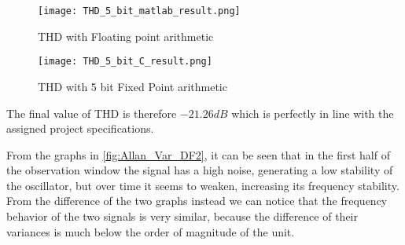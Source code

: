 \begin{figure}[ht]
	\begin{minipage}[b]{0.5\linewidth}
		\centering
		\texttt{[image: THD\_5\_bit\_matlab\_result.png]}
		\caption{THD with Floating point arithmetic}
		\label{fig:THD_5_bit_FL_P}
	\end{minipage}
	\hspace{0.5cm}
	\begin{minipage}[b]{0.5\linewidth}
		\centering
		\texttt{[image: THD\_5\_bit\_C\_result.png]}
		\caption{THD with 5 bit Fixed Point arithmetic}
		\label{fig:THD_5_bit_FIX_P}
	\end{minipage}
\end{figure}

The final value of THD is therefore $-21.26 dB$ which is perfectly in line with the assigned project specifications.



From the graphs in \autoref{fig:Allan_Var_DF2}, it can be seen that in the first half of the observation window the signal has a high noise, generating a low stability of the oscillator, but over time it seems to weaken, increasing its frequency stability. From the difference of the two graphs instead we can notice that the frequency behavior of the two signals is very similar, because the difference of their variances is much below the order of magnitude of the unit.